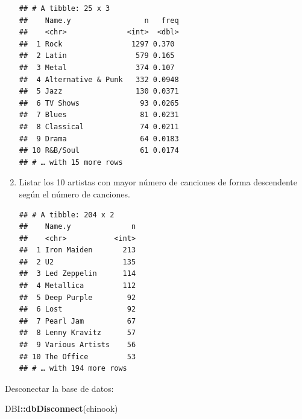 \documentclass[]{book}
\newenvironment{Shaded}{\begin{snugshade}}{\end{snugshade}}
\newcommand{\DataTypeTok}[1]{\textcolor[rgb]{0.13,0.29,0.53}{#1}}
\newcommand{\KeywordTok}[1]{\textcolor[rgb]{0.13,0.29,0.53}{\textbf{#1}}}
\newcommand{\NormalTok}[1]{#1}
\newcommand{\OperatorTok}[1]{\textcolor[rgb]{0.81,0.36,0.00}{\textbf{#1}}}
\newcommand{\StringTok}[1]{\textcolor[rgb]{0.31,0.60,0.02}{#1}}
\begin{document}
\begin{enumerate}
\begin{verbatim}
## # A tibble: 25 x 3
##    Name.y                 n   freq
##    <chr>              <int>  <dbl>
##  1 Rock                1297 0.370 
##  2 Latin                579 0.165 
##  3 Metal                374 0.107 
##  4 Alternative & Punk   332 0.0948
##  5 Jazz                 130 0.0371
##  6 TV Shows              93 0.0265
##  7 Blues                 81 0.0231
##  8 Classical             74 0.0211
##  9 Drama                 64 0.0183
## 10 R&B/Soul              61 0.0174
## # … with 15 more rows
\end{verbatim}
\item
  Listar los 10 artistas con mayor número de canciones
  de forma descendente según el número de canciones.

\begin{Shaded}
\end{Shaded}

\begin{verbatim}
## # A tibble: 204 x 2
##    Name.y              n
##    <chr>           <int>
##  1 Iron Maiden       213
##  2 U2                135
##  3 Led Zeppelin      114
##  4 Metallica         112
##  5 Deep Purple        92
##  6 Lost               92
##  7 Pearl Jam          67
##  8 Lenny Kravitz      57
##  9 Various Artists    56
## 10 The Office         53
## # … with 194 more rows
\end{verbatim}
\end{enumerate}

Desconectar la base de datos:

\begin{Shaded}
\begin{Highlighting}[]
\NormalTok{DBI}\OperatorTok{::}\KeywordTok{dbDisconnect}\NormalTok{(chinook)            }
\end{Highlighting}
\end{Shaded}
\end{document}
